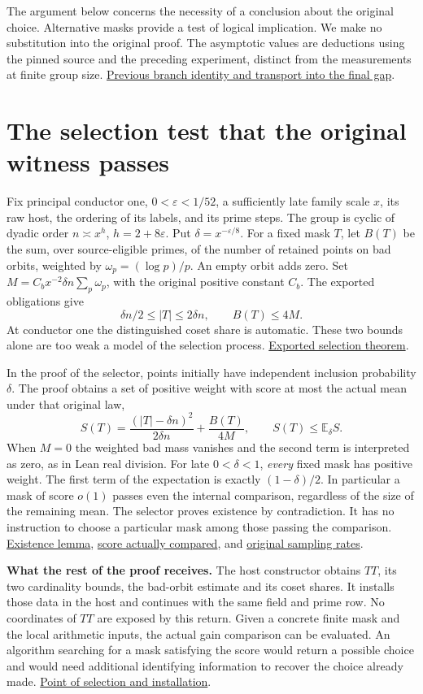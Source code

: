 \documentclass[12pt,letterpaper]{article}
\newcommand{\orig}[3]{\href{https://github.com/nousentllc/riemann-hypothesis/blob/40e56bab026552e089d7afcfeff08d2defb9c005/src/#1.lean\#L#2}{#3}}
\newcommand{\para}[1]{\par\medskip\noindent\textbf{#1}\quad}
\newcommand{\pagepart}[1]{\clearpage\section{#1}}
\begin{document}
The argument below concerns the necessity of a conclusion about the original choice. Alternative masks provide a test of logical implication. We make no substitution into the original proof. The asymptotic values are deductions using the pinned source and the preceding experiment, distinct from the measurements at finite group size.
\href{https://github.com/nousentllc/riemann-hypothesis/pull/11}{Previous branch identity and transport into the final gap}.

\pagepart{The selection test that the original witness passes}
Fix principal conductor one, \(0<\varepsilon<1/52\), a sufficiently late family scale \(x\), its raw host, the ordering of its labels, and its prime steps. The group is cyclic of dyadic order \(n\asymp x^h\), \(h=2+8\varepsilon\). Put \(\delta=x^{-\varepsilon/8}\). For a fixed mask \(T\), let \(B(T)\) be the sum, over source-eligible primes, of the number of retained points on bad orbits, weighted by \(\omega_p=(\log p)/p\). An empty orbit adds zero. Set \(M=C_bx^{-2}\delta n\sum_p\omega_p\), with the original positive constant \(C_b\). The exported obligations give
\[
  \delta n/2\le |T|\le2\delta n,\qquad B(T)\le 4M .
\]
At conductor one the distinguished coset share is automatic. These two bounds alone are too weak a model of the selection process.
\orig{Development/AutomorphicArithmetic/ThickFrames/topsChoiceH}{33}{Exported selection theorem}.

In the proof of the selector, points initially have independent inclusion probability \(\delta\). The proof obtains a set of positive weight with score at most the actual mean under that original law,
\[
 S(T)=\frac{(|T|-\delta n)^2}{2\delta n}+\frac{B(T)}{4M},
 \qquad S(T)\le {\mathbb E}_{\delta}S .
\]
When \(M=0\) the weighted bad mass vanishes and the second term is interpreted as zero, as in Lean real division. For late \(0<\delta<1\), \emph{every} fixed mask has positive weight. The first term of the expectation is exactly \((1-\delta)/2\). In particular a mask of score \(o(1)\) passes even the internal comparison, regardless of the size of the remaining mean. The selector proves existence by contradiction. It has no instruction to choose a particular mask among those passing the comparison.
\orig{Development/AutomorphicArithmetic/ThickFrames/select}{42}{Existence lemma},
\orig{Development/AutomorphicArithmetic/ThickFrames/select}{136}{score actually compared}, and
\orig{Development/AutomorphicArithmetic/ThickFrames/topsGroup}{101}{original sampling rates}.

\para{What the rest of the proof receives.} The host constructor obtains \(TT\), its two cardinality bounds, the bad-orbit estimate and its coset shares. It installs those data in the host and continues with the same field and prime row. No coordinates of \(TT\) are exposed by this return. Given a concrete finite mask and the local arithmetic inputs, the actual gain comparison can be evaluated. An algorithm searching for a mask satisfying the score would return a possible choice and would need additional identifying information to recover the choice already made.
\orig{Development/AutomorphicArithmetic/ShortNorms/hostOfFieldOf}{218}{Point of selection and installation}.
\end{document}
